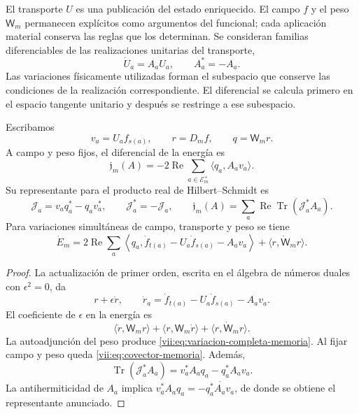 El transporte \(U\) es una publicación del estado enriquecido. El campo
\(f\) y el peso \(\mathsf W_m\) permanecen explícitos como argumentos
del funcional; cada aplicación material conserva las reglas que los
determinan. Se consideran familias diferenciables de las realizaciones
unitarias del transporte,
\[
 \dot U_a=A_aU_a,\qquad A_a^*=-A_a.
\]
Las variaciones físicamente utilizadas forman el subespacio que conserve
las condiciones de la realización correspondiente. El diferencial se
calcula primero en el espacio tangente unitario y después se restringe
a ese subespacio.

\begin{proposition}
\label{vii:prop:covector-memoria}
Escribamos
\[
 v_a=U_af_{s(a)},\qquad r=D_mf,\qquad q=\mathsf W_mr.
\]
A campo y peso fijos, el diferencial de la energía es
\begin{equation}
 \mathfrak j_m(A)=-2\operatorname{Re}
       \sum_{a\in\mathcal E_m^+}\langle q_a,A_av_a\rangle .
 \label{vii:eq:covector-memoria}
\end{equation}
Su representante para el producto real de Hilbert--Schmidt es
\begin{equation}
 \mathcal J_a=v_aq_a^*-q_av_a^*,\qquad
 \mathcal J_a^*=-\mathcal J_a,\qquad
 \mathfrak j_m(A)=
 \sum_a\operatorname{Re}\operatorname{Tr}(\mathcal J_a^*A_a).
 \label{vii:eq:representante-corriente-discreta}
\end{equation}
Para variaciones simultáneas de campo, transporte y peso se tiene
\begin{equation}
 \dot E_m=
 2\operatorname{Re}\sum_a
 \left\langle q_a,\dot f_{t(a)}-U_a\dot f_{s(a)}-A_av_a\right\rangle
 +\langle r,\dot{\mathsf W}_mr\rangle .
 \label{vii:eq:variacion-completa-memoria}
\end{equation}
\end{proposition}

\begin{proof}
La actualización de primer orden, escrita en el álgebra de números
duales con \(\epsilon^2=0\), da
\[
 r+\epsilon\dot r,\qquad
 \dot r_a=\dot f_{t(a)}-U_a\dot f_{s(a)}-A_av_a.
\]
El coeficiente de \(\epsilon\) en la energía es
\[
 \langle\dot r,\mathsf W_mr\rangle+
 \langle r,\mathsf W_m\dot r\rangle+
 \langle r,\dot{\mathsf W}_mr\rangle.
\]
La autoadjunción del peso produce
\eqref{vii:eq:variacion-completa-memoria}. Al fijar campo y peso queda
\eqref{vii:eq:covector-memoria}. Además,
\[
 \operatorname{Tr}(\mathcal J_a^*A_a)
 =v_a^*A_aq_a-q_a^*A_av_a.
\]
La antihermiticidad de \(A_a\) implica
\(v_a^*A_aq_a=-\overline{q_a^*A_av_a}\), de donde se obtiene
el representante anunciado.
\end{proof}


